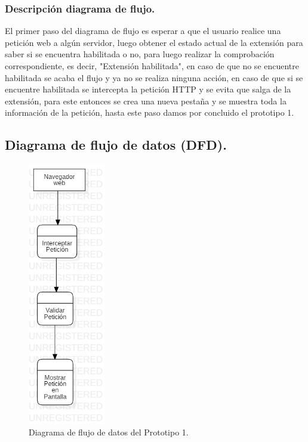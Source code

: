 \documentclass[12pt, a4paper, titlepage]{report}
\begin{document}
		        \subsubsection{Descripción diagrama de flujo.}
		        El primer paso del diagrama de flujo es esperar a que el usuario realice una petición web a algún servidor, luego obtener el estado actual de la extensión para saber si se encuentra habilitada o no, para luego realizar la comprobación correspondiente, es decir, "Extensión habilitada", en caso de que no se encuentre habilitada se acaba el flujo y ya no se realiza ninguna acción, en caso de que si se encuentre habilitada se intercepta la petici\'on HTTP y se evita que salga de la extensión, para este entonces se crea una nueva pestaña y se muestra toda la información de la petici\'on, hasta este paso damos por concluido el prototipo 1.
    			\subsection{Diagrama de flujo de datos (DFD).}
        			\begin{figure}[H]
        			    \begin{center}
    			        \includegraphics[width=0.3\textwidth]{imagenes/Desarrollo/Prototipo_1/DFD_P1.png}
    			        \caption{Diagrama de flujo de datos del Prototipo 1.}
    				\end{center}
    			\end{figure}
\end{document}
